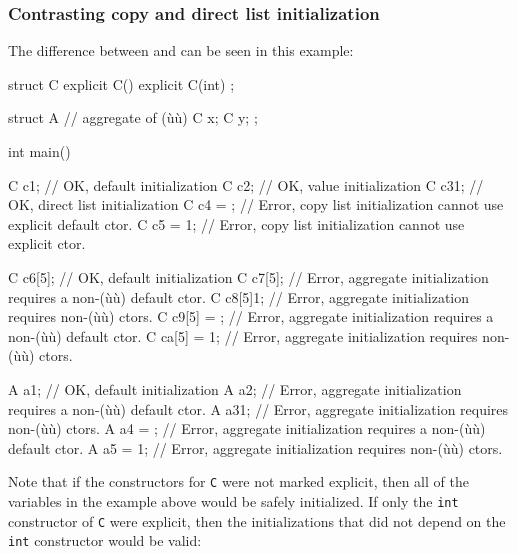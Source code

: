 \subsubsection[Contrasting copy and direct list initialization]{Contrasting copy and direct list initialization}\label{contrasting-copy-and-direct-list-initialization}

The difference between  and
 can be seen in this example:

\begin{emcppslisting}
struct C
{
    explicit C() { }
    explicit C(int) { }
};

struct A  // aggregate of (ù{}ù)
{
    C x;
    C y;
};

int main()
{
    C c1;           // OK, default initialization
    C c2{};         // OK, value initialization
    C c3{1};        // OK, direct list initialization
    C c4 = {};      // Error, copy list initialization cannot use explicit default ctor.
    C c5 = {1};     // Error, copy list initialization cannot use explicit ctor.

    C c6[5];        // OK, default initialization
    C c7[5]{};      // Error, aggregate initialization requires a non-(ù{}ù) default ctor.
    C c8[5]{1};     // Error, aggregate initialization requires non-(ù{}ù) ctors.
    C c9[5] = {};   // Error, aggregate initialization requires a non-(ù{}ù) default ctor.
    C ca[5] = {1};  // Error, aggregate initialization requires non-(ù{}ù) ctors.

    A a1;           // OK, default initialization
    A a2{};         // Error, aggregate initialization requires a non-(ù{}ù) default ctor.
    A a3{1};        // Error, aggregate initialization requires non-(ù{}ù) ctors.
    A a4 = {};      // Error, aggregate initialization requires a non-(ù{}ù) default ctor.
    A a5 = {1};     // Error, aggregate initialization requires non-(ù{}ù) ctors.
}
\end{emcppslisting}
    

\noindent Note that if the constructors for \lstinline!C! were not marked explicit,
then all of the variables in the example above would be safely
initialized. If only the \lstinline!int! constructor of \lstinline!C! were
explicit, then the initializations that did not depend on the
\lstinline!int! constructor would be valid:

